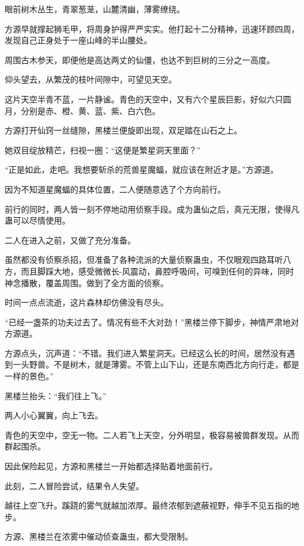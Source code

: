 
\begin{this_body}

眼前树木丛生，青翠葱茏，山麓清幽，薄雾缭绕。

方源早就撑起狮毛甲，将周身护得严严实实。他打起十二分精神，迅速环顾四周，发现自己正身处于一座山峰的半山腰处。

周围古木参天，即便他是高达两丈的仙僵，也达不到巨树的三分之一高度。

仰头望去，从繁茂的枝叶间隙中，可望见天空。

这片天空半青不蓝，一片静谧。青色的天空中，又有六个星辰巨影，好似六只圆月，分别是赤、橙、黄、蓝、紫、白六色。

方源打开仙窍一丝缝隙，黑楼兰便旋即出现，双足踏在山石之上。

她双目绽放精芒，扫视一圈：“这便是繁星洞天里面？”

“正是如此，走吧。我想要斩杀的荒兽星魔蝠，就应该在附近才是。”方源道。

因为不知道星魔蝠的具体位置，二人便随意选了个方向前行。

前行的同时，两人皆一刻不停地动用侦察手段。成为蛊仙之后，真元无限，使得凡蛊可以尽情使用。

二人在进入之前，又做了充分准备。

虽然都没有侦察杀招，但准备了各种流派的大量侦察蛊虫，不仅眼观四路耳听八方，而且脚踩大地，感受微微长-风震动，鼻腔呼吸间，可嗅到任何的异味，同时神念播散，覆盖周围。做到了全方面的侦察。

时间一点点流逝，这片森林却仿佛没有尽头。

“已经一盏茶的功夫过去了。情况有些不大对劲！”黑楼兰停下脚步，神情严肃地对方源道。

方源点头，沉声道：“不错。我们进入繁星洞天。已经这么长的时间，居然没有遇到一头野兽。不是树木，就是薄雾。不管上山下山，还是东南西北方向行走，都是一样的景色。”

黑楼兰抬头：“我们往上飞。”

两人小心翼翼，向上飞去。

青色的天空中，空无一物。二人若飞上天空，分外明显，极容易被兽群发现。从而群起围杀。

因此保险起见，方源和黑楼兰一开始都选择贴着地面前行。

此刻，二人冒险尝试，结果令人失望。

越往上空飞升。蹊跷的雾气就越加浓厚。最终浓郁到遮蔽视野，伸手不见五指的地步。

方源、黑楼兰在浓雾中催动侦查蛊虫，都大受限制。


\end{this_body}
